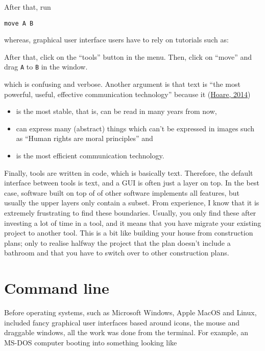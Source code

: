 \documentclass[
  14pt
  american,
  paper=a4,
  ,captions=tableheading
]{scrbook}
\newcommand{\passthrough}[1]{#1}
\providecommand{\tightlist}{%
  \setlength{\itemsep}{0pt}\setlength{\parskip}{0pt}}
\renewenvironment{quote}{\begin{customblockquote}\list{}{\rightmargin=0em\leftmargin=0em}%
\item\relax\color{blockquote-text}\ignorespaces}{\unskip\unskip\endlist\end{customblockquote}}
\begin{document}
\begin{quote}
After that, run

\begin{lstlisting}
move A B
\end{lstlisting}
\end{quote}

whereas, graphical user interface users have to rely on tutorials such
as:

\begin{quote}
After that, click on the ``tools'' button in the menu. Then, click on
``move'' and drag \passthrough{\lstinline!A!} to
\passthrough{\lstinline!B!} in the window.
\end{quote}

which is confusing and verbose. Another argument is that text is ``the
most powerful, useful, effective communication technology'' because it
(\protect\hyperlink{ref-hoare2014bet}{Hoare, 2014})

\begin{itemize}
\tightlist
\item
  is the most stable, that is, can be read in many years from now,
\item
  can express many (abstract) things which can't be expressed in images
  such as ``Human rights are moral principles'' and
\item
  is the most efficient communication technology.
\end{itemize}

Finally, tools are written in code, which is basically text. Therefore,
the default interface between tools is text, and a GUI is often just a
layer on top. In the best case, software built on top of of other
software implements all features, but usually the upper layers only
contain a subset. From experience, I know that it is extremely
frustrating to find these boundaries. Usually, you only find these after
investing a lot of time in a tool, and it means that you have migrate
your existing project to another tool. This is a bit like building your
house from construction plans; only to realise halfway the project that
the plan doesn't include a bathroom and that you have to switch over to
other construction plans.

\hypertarget{sec:command-line}{%
\section{Command line}\label{sec:command-line}}

Before operating systems, such as Microsoft Windows, Apple MacOS and
Linux, included fancy graphical user interfaces based around icons, the
mouse and draggable windows, all the work was done from the terminal.
For example, an MS-DOS computer booting into something looking like
\end{document}
